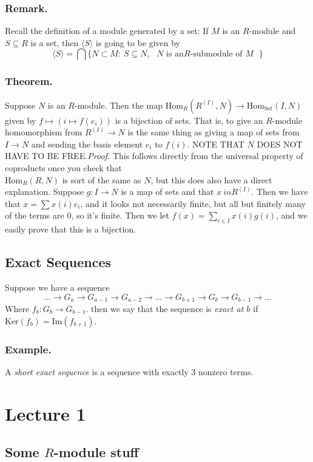 \documentclass{article}
\newcommand{\beginproof}{\vspace{10pt}\newline\textit{Proof.}\hspace{1em}}
\begin{document}
\subsubsection{Remark.} Recall the definition of a module generated by a set: If
$M$ is an $R$-module and $S\subseteq R$ is a set, then $\langle S\rangle$ is
going to be given by 
\[ \langle S \rangle = \bigcap\{N\subset M: \: S\subseteq N, \text{ $N$ is an
$R$-submodule of $M$ }\}\]
\subsubsection{Theorem.} Suppose $N$ is an $R$-module. Then the map
$\text{Hom}_R(R^{(I)}, N) \to \text{Hom}_{\text{Set}}(I, N)$ given by $f \mapsto
(i\mapsto f(e_i))$ is a bijection of sets. That is, to give an $R$-module
homomorphism from $R^{(I)}\to N$ is the same thing as giving a map of sets
from $I\to N$ and sending the basis element $e_i$ to $f(i)$. NOTE THAT $N$ DOES
NOT HAVE TO BE FREE.\beginproof
This follows directly from the universal property of coproducts once you check
that\\ $\text{Hom}_R(R,N)$ is sort of the same as $N$, but this does also have a
direct explanation. Suppose $g: I \to N$ is a map of sets and that $x\ in
R^{(I)}$. Then we have that $x = \sum x(i)e_i$, and it looks not necessarily
finite, but all but finitely many of the terms are $0$, so it's finite. Then we
let $f(x) = \sum_{i \in I} x(i) g(i)$, and we easily prove that this is a
bijection.
\subsection{Exact Sequences} Suppose we have a sequence 
\[\hdots \to G_a \to G_{a-1} \to G_{a-2} \to \hdots \to G_{b+1} \to G_{b} \to
G_{b-1} \to \hdots\]
Where $f_{b}: G_b \to G_{b-1}$. then we say that the sequence is \textit{exact
at $b$} if $\text{Ker}(f_b) = \text{Im}(f_{b+1})$.
\subsubsection{Example.} A \textit{short exact sequence} is a sequence with
exactly 3 nonzero terms.
\section{Lecture 1}
\subsection{Some $R$-module stuff}
\end{document}

